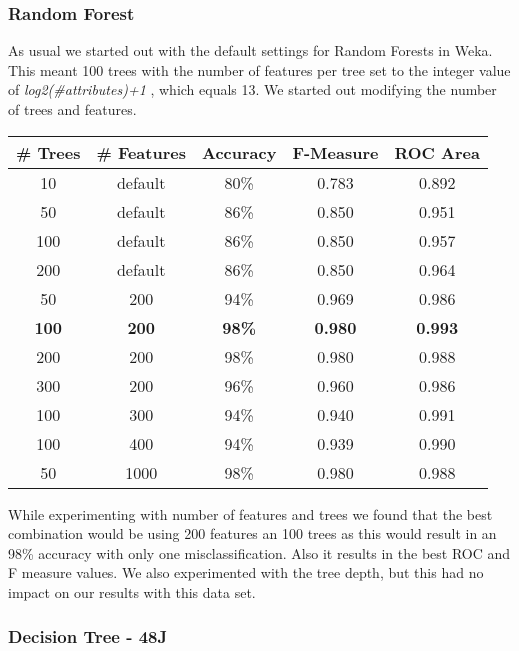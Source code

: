 \documentclass{article}
\begin{document}
\subsubsection{Random Forest}
As usual we started out with the default settings for Random Forests in Weka. This meant 100 trees with the number of features per tree set to the integer value of \emph{log2(\#attributes)+1} , which equals 13. We started out modifying the number of trees and features.
\begin{center}
\begin{tabular}{ c | c | c | c | c }
\textbf{\# Trees} & \textbf{\# Features} & \textbf{Accuracy} & \textbf{F-Measure} & \textbf{ROC Area}\\
\hline
10 & default & 80\% & 0.783 & 0.892\\
50 & default & 86\% & 0.850 & 0.951\\
100 & default & 86\% & 0.850 & 0.957\\
200 & default & 86\% & 0.850 & 0.964\\
50 & 200 & 94\% & 0.969 & 0.986\\
\textbf{100} & \textbf{200} & \textbf{98\%} & \textbf{0.980} & \textbf{0.993}\\
200 & 200 & 98\% & 0.980 & 0.988\\
300 & 200 & 96\% & 0.960 & 0.986\\
100 & 300 & 94\% & 0.940 & 0.991\\
100 & 400 & 94\% & 0.939 & 0.990\\
50 & 1000 & 98\% & 0.980 & 0.988\\

\end{tabular}
\end{center}

While experimenting with number of features and trees we found that the best combination would be using 200 features an 100 trees as this would result in an 98\% accuracy with only one misclassification. Also it results in the best ROC and F measure values. We also experimented with the tree depth, but this had no impact on our results with this data set.

\subsubsection{Decision Tree - 48J}
\end{document}
